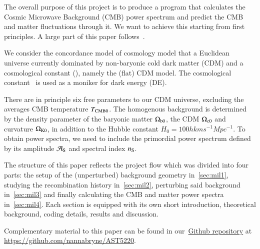 






The overall purpose of this project is to produce a program that calculates the Cosmic Microwave Background (CMB) power spectrum and predict the CMB and matter fluctuations through it. We want to achieve this starting from first principles. A large part of this paper follows~\citet{Callin2006}.

We consider the concordance model of cosmology model that a Euclidean universe currently dominated by non-baryonic cold dark matter (CDM) and a cosmological constant (\textLambda), namely the (flat) \textLambda CDM model. The cosmological constant \textLambda\, is used as a moniker for dark energy (DE).~\citep{DodelsonBook}

There are in principle six free parameters to our \textLambda CDM universe, excluding the averages CMB temperature $T_{\mathrm{CMB}0}$. The homogenous background is determined by the density parameter of the baryonic matter $\Omega_\mathrm{b0}$, the CDM $\Omega_\mathrm{c0}$ and curvature $\Omega_\mathrm{K0}$, in addition to the Hubble constant $H_0 =100h \unit{km} \unit{s^{-1}} \unit{Mpc^{-1}}$. To obtain power spectra, we need to include the primordial power spectrum defined by its amplitude $\mathcal{A}_\mathrm{S}$ and spectral index $n_\mathrm{S}$.


The structure of this paper reflects the project flow which was divided into four parts: the setup of the (unperturbed) background geometry in~\cref{sec:mil1}, studying the recombination history in~\cref{sec:mil2}, perturbing said background in~\cref{sec:mil3} and finally calculating the CMB and matter power spectra in~\cref{sec:mil4}. Each section is equipped with its own short introduction, theoretical background, coding details, results and discussion. 

Complementary material to this paper can be found in our~\href{https://github.com/nannabryne/AST5220}{Github repository} at \url{https://github.com/nannabryne/AST5220}.